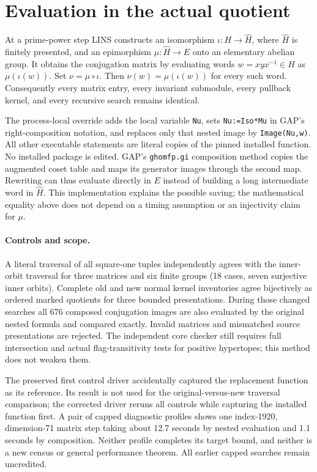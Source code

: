 \documentclass[11pt]{article}
\begin{document}
\section{Evaluation in the actual quotient}
At a prime-power step LINS constructs an isomorphism
$\iota:H\to\widehat H$, where $\widehat H$ is finitely presented, and an
epimorphism $\mu:\widehat H\to E$ onto an elementary abelian group.
It obtains the conjugation matrix by evaluating words
$w=xyx^{-1}\in H$ as $\mu(\iota(w))$.
Set $\nu=\mu\circ\iota$. Then $\nu(w)=\mu(\iota(w))$ for every such
word. Consequently every matrix entry, every invariant submodule, every
pullback kernel, and every recursive search remains identical.

The process-local override adds the local variable \texttt{Nu}, sets
\texttt{Nu:=Iso*Mu} in GAP's right-composition notation, and replaces
only that nested image by \texttt{Image(Nu,w)}. All other executable
statements are literal copies of the pinned installed function. No
installed package is edited. GAP's \texttt{ghomfp.gi} composition method
copies the augmented coset table and maps its generator images through
the second map. Rewriting can thus evaluate directly in $E$ instead of
building a long intermediate word in $\widehat H$. This implementation
explains the possible saving; the mathematical equality above does not
depend on a timing assumption or an injectivity claim for $\mu$.

\paragraph{Controls and scope.}
A literal traversal of all square-one tuples independently agrees with
the inner-orbit traversal for three matrices and six finite groups
(18 cases, seven surjective inner orbits). Complete old and new normal
kernel inventories agree bijectively as ordered marked quotients for
three bounded presentations. During those changed searches all 676
composed conjugation images are also evaluated by the original nested
formula and compared exactly. Invalid matrices and mismatched source
presentations are rejected. The independent core checker still requires
full intersection and actual flag-transitivity tests for positive
hypertopes; this method does not weaken them.

The preserved first control driver accidentally captured the replacement
function as its reference. Its result is not used for the original-versus-new
traversal comparison; the corrected driver reruns all controls while
capturing the installed function first. A pair of capped diagnostic
profiles shows one index-1920, dimension-71 matrix step taking about
12.7 seconds by nested evaluation and 1.1 seconds by composition.
Neither profile completes its target bound, and neither is a new census
or general performance theorem. All earlier capped searches remain
uncredited.
\end{document}
